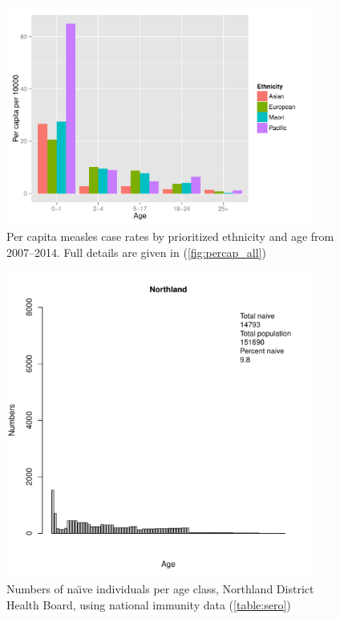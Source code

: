 \documentclass{article}
\begin{document}
\begin{figure}[H]
     \begin{center}
     \includegraphics[width=0.9\textwidth]{percap_eth_age.pdf}
     \end{center}
     \caption{Per capita measles case rates by prioritized ethnicity and age from 2007--2014. Full details are given in (\autoref{fig:percap_all})}
     \label{fig:PerCapAgeEth}
\end{figure}

\begin{figure}[H]
     \begin{center}
     \includegraphics[width=0.9\textwidth]{dhb1.pdf}
     \end{center}
     \caption{Numbers of na\"{\i}ve individuals per age class, Northland District Health Board, using national immunity data (\autoref{table:sero})}
     \label{fig:Northland}
\end{figure}
\end{document}
